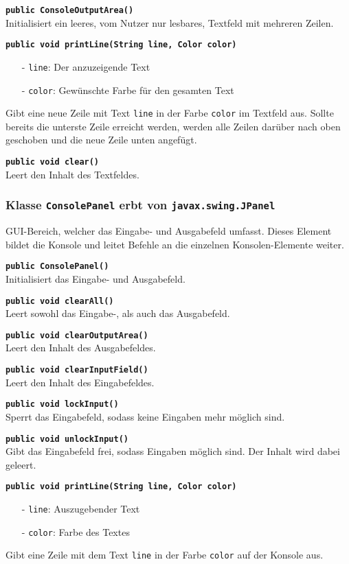 \documentclass[parskip=full,11pt,twoside]{scrartcl}
\begin{document}
\textbf{\texttt{public ConsoleOutputArea()}}\\
Initialisiert ein leeres, vom Nutzer nur lesbares, Textfeld mit mehreren Zeilen.

\textbf{\texttt{public void printLine(String line, Color color)}}
\begin{itemize}[noitemsep]
	\item[-] \texttt{line}: Der anzuzeigende Text
	\item[-] \texttt{color}: Gewünschte Farbe für den gesamten Text
\end{itemize}
Gibt eine neue Zeile mit Text \texttt{line} in der Farbe \texttt{color} im Textfeld aus. Sollte bereits die unterste Zeile erreicht werden, werden alle Zeilen darüber nach oben geschoben und die neue Zeile unten angefügt.

\textbf{\texttt{public void clear()}}\\
Leert den Inhalt des Textfeldes.

\subsubsection{Klasse \texttt{ConsolePanel} erbt von \texttt{javax.swing.JPanel}}

GUI-Bereich, welcher das Eingabe- und Ausgabefeld umfasst. Dieses Element bildet die Konsole und leitet Befehle an die einzelnen Konsolen-Elemente weiter.

\textbf{\texttt{public ConsolePanel()}}\\
Initialisiert das Eingabe- und Ausgabefeld.

\textbf{\texttt{public void clearAll()}}\\
Leert sowohl das Eingabe-, als auch das Ausgabefeld.

\textbf{\texttt{public void clearOutputArea()}}\\
Leert den Inhalt des Ausgabefeldes.

\textbf{\texttt{public void clearInputField()}}\\
Leert den Inhalt des Eingabefeldes.

\textbf{\texttt{public void lockInput()}}\\
Sperrt das Eingabefeld, sodass keine Eingaben mehr möglich sind.

\textbf{\texttt{public void unlockInput()}}\\
Gibt das Eingabefeld frei, sodass Eingaben möglich sind. Der Inhalt wird dabei geleert.

\textbf{\texttt{public void printLine(String line, Color color)}}
\begin{itemize}[noitemsep]
	\item[-] \texttt{line}: Auszugebender Text
	\item[-] \texttt{color}: Farbe des Textes
\end{itemize}
Gibt eine Zeile mit dem Text \texttt{line} in der Farbe \texttt{color} auf der Konsole aus.
\end{document}
